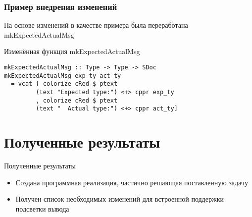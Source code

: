 \documentclass[utf8,russian]{beamer}
\begin{document}
\begin{frame}[fragile]
\frametitle{Пример внедрения изменений}

\begin{block}{}
На основе изменений в качестве примера была переработана mkExpectedActualMsg
\end{block}

\begin{block}{Изменённая функция mkExpectedActualMsg}
\begin{lstlisting}
mkExpectedActualMsg :: Type -> Type -> SDoc
mkExpectedActualMsg exp_ty act_ty
  = vcat [ colorize cRed $ ptext 
         (text "Expected type:") <+> cppr exp_ty
         , colorize cRed $ ptext 
         (text "  Actual type:") <+> cppr act_ty]
\end{lstlisting}
\end{block}

\end{frame}

\section{Полученные результаты}
\begin{frame}{Полученные результаты}
\begin{itemize}
  \item Создана программная реализация, частично решающая поставленную задачу
  \item Получен список необходимых изменений для встроенной поддержки подсветки вывода
\end{itemize}
\end{frame}
\end{document}
